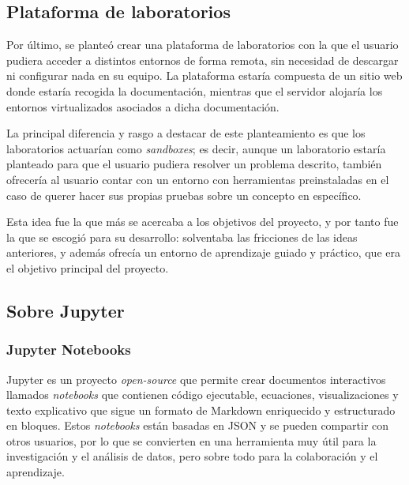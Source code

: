         \subsection{Plataforma de laboratorios}

            Por último, se planteó crear una plataforma de laboratorios con la que el usuario pudiera acceder a distintos entornos de forma remota, sin necesidad de descargar ni configurar nada en su equipo. La plataforma estaría compuesta de un sitio web donde estaría recogida la documentación, mientras que el servidor alojaría los entornos virtualizados asociados a dicha documentación.
            
            La principal diferencia y rasgo a destacar de este planteamiento es que los laboratorios actuarían como \textit{sandboxes}; es decir, aunque un laboratorio estaría planteado para que el usuario pudiera resolver un problema descrito, también ofrecería al usuario contar con un entorno con herramientas preinstaladas en el caso de querer hacer sus propias pruebas sobre un concepto en específico.

            Esta idea fue la que más se acercaba a los objetivos del proyecto, y por tanto fue la que se escogió para su desarrollo: solventaba las fricciones de las ideas anteriores, y además ofrecía un entorno de aprendizaje guiado y práctico, que era el objetivo principal del proyecto.

            \newpage

        \subsection{Sobre Jupyter}

            \subsubsection{Jupyter Notebooks}
                
                Jupyter \cite{jupyter} es un proyecto \textit{open-source} que permite crear documentos interactivos llamados \textit{notebooks} que contienen código ejecutable, ecuaciones, visualizaciones y texto explicativo que sigue un formato de Markdown enriquecido y estructurado en bloques. Estos \textit{notebooks} están basadas en JSON y se pueden compartir con otros usuarios, por lo que se convierten en una herramienta muy útil para la investigación y el análisis de datos, pero sobre todo para la colaboración y el aprendizaje.
            
